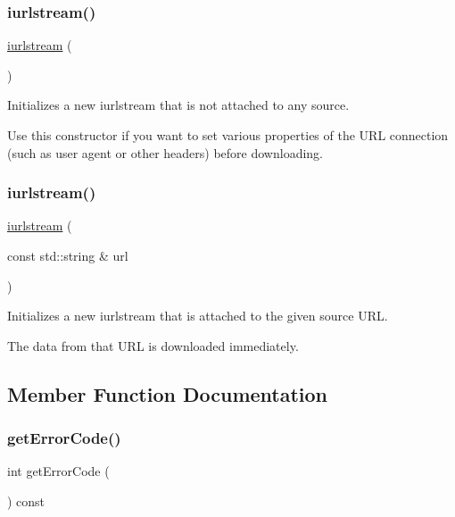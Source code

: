 \subsubsection{\texorpdfstring{iurlstream()}{iurlstream()}\hspace{0.1cm}{\footnotesize\ttfamily [1/2]}}
{\footnotesize\ttfamily \mbox{\hyperlink{classiurlstream}{iurlstream}} (\begin{DoxyParamCaption}{ }\end{DoxyParamCaption})}



Initializes a new iurlstream that is not attached to any source. 

Use this constructor if you want to set various properties of the U\+RL connection (such as user agent or other headers) before downloading. \mbox{\label{classiurlstream_a5fa5ba70cbe8c2ad3f93876c381464cb}} 
\subsubsection{\texorpdfstring{iurlstream()}{iurlstream()}\hspace{0.1cm}{\footnotesize\ttfamily [2/2]}}
{\footnotesize\ttfamily \mbox{\hyperlink{classiurlstream}{iurlstream}} (\begin{DoxyParamCaption}\item[{const std\+::string \&}]{url }\end{DoxyParamCaption})}



Initializes a new iurlstream that is attached to the given source U\+RL. 

The data from that U\+RL is downloaded immediately. 

\subsection{Member Function Documentation}
\mbox{\label{classiurlstream_a9e79924a3e50273b08ab5b3a8c12a221}} 
\subsubsection{\texorpdfstring{get\+Error\+Code()}{getErrorCode()}}
{\footnotesize\ttfamily int get\+Error\+Code (\begin{DoxyParamCaption}{ }\end{DoxyParamCaption}) const}




